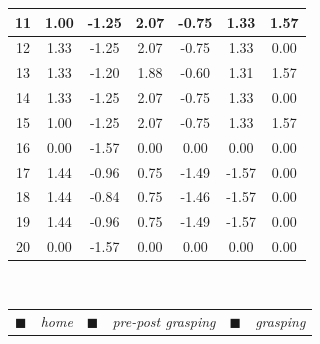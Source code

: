 \begin{table}
\begin{tabular}{c|c|c|c|c|c|c}
		\hline 
		\rowcolor{pre-post-grasping-gray} 	11  &    1.00       &     -1.25    &     2.07     &     -0.75    &     1.33     &     1.57     \\ 
		\hline 
		\rowcolor{pre-post-grasping-gray} 	12  &    1.33       &     -1.25    &     2.07     &     -0.75    &     1.33     &     0.00     \\ 
		\hline 
		\rowcolor{grasping-gray} 		    13  &    1.33       &     -1.20    &     1.88     &     -0.60    &     1.31     &     1.57     \\ 
		\hline 
		\rowcolor{pre-post-grasping-gray} 	14  &    1.33       &     -1.25    &     2.07     &     -0.75    &     1.33     &     0.00     \\ 
		\hline
		\rowcolor{pre-post-grasping-gray} 	15  &    1.00       &     -1.25    &     2.07     &     -0.75    &     1.33     &     1.57     \\ 
		\hline
		\rowcolor{home-gray} 				16  &    0.00       &     -1.57    &     0.00     &     0.00     &     0.00     &     0.00     \\ 
		\hline
		\rowcolor{pre-post-grasping-gray} 	17  &    1.44       &     -0.96    &     0.75     &     -1.49    &     -1.57    &     0.00     \\ 
		\hline
		\rowcolor{grasping-gray} 			18  &    1.44       &     -0.84    &     0.75     &     -1.46    &     -1.57    &     0.00     \\ 
		\hline
		\rowcolor{pre-post-grasping-gray} 	19  &    1.44       &     -0.96    &     0.75     &     -1.49    &     -1.57    &     0.00     \\ 
		\hline
		\rowcolor{home-gray} 				20  &    0.00       &     -1.57    &     0.00     &      0.00    &      0.00    &     0.00     \\ 
		\hline
	\end{tabular}
	\\
	\begin{tabular}{cccccc}
		\textcolor{home-gray}{$\blacksquare$} & \textit{home} &
		\textcolor{pre-post-grasping-gray}{$\blacksquare$} & \textit{pre-post grasping} &
		\textcolor{grasping-gray}{$\blacksquare$} & \textit{grasping} \\
	\end{tabular}
\end{table}

\FloatBarrier

